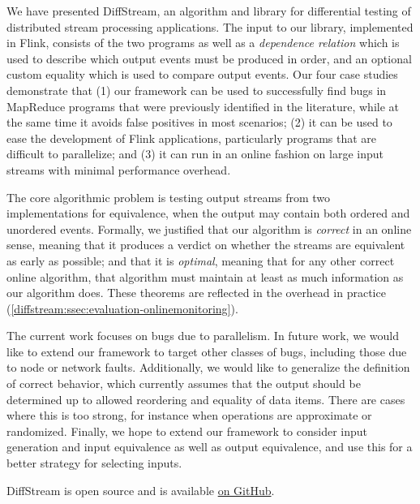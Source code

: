 We have presented DiffStream{}, an algorithm and library for differential testing of
distributed stream processing applications.  The input to our library, implemented in Flink, consists of the two programs as well as
a \emph{dependence relation} which is used to describe which output
events must be produced in order, and an optional custom equality
which is used to compare output events. Our four case studies
demonstrate that (1) our framework can be used to successfully find
bugs in MapReduce programs that were previously identified in the
literature, while at the same time it avoids false positives in most
scenarios; (2) it can be used to ease the development of Flink
applications, particularly programs that are difficult to parallelize;
and (3) it can run in an online fashion on large input streams
with minimal performance overhead.

The core algorithmic problem is testing output streams from two implementations for equivalence, when the output may contain both ordered and unordered events.
Formally, we justified that our algorithm is \emph{correct} in an online sense, meaning that it produces a verdict on whether the streams are equivalent as early as possible; and that it is \emph{optimal}, meaning that for any other correct online algorithm, that algorithm must maintain at least as much information as our algorithm does.
These theorems are reflected in the overhead in practice (\cref{diffstream:ssec:evaluation-onlinemonitoring}).

The current work focuses on bugs due to parallelism. In future work, we would like to extend our framework to target other classes of bugs, including those due to node or network faults.
Additionally, we would like to generalize the definition of correct behavior, which currently assumes that the output should be determined up to allowed reordering and equality of data items. There are cases where this is too strong, for instance when operations are approximate or randomized.
Finally, we hope to extend our framework to consider input generation and input equivalence as well as output equivalence, and use this for a better strategy for selecting inputs.

DiffStream is open source and is available \href{https://github.com/fniksic/diffstream}{on GitHub}.
